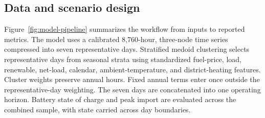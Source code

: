 \documentclass[preprint,12pt]{elsarticle}
\begin{document}
\subsection{Data and scenario design}

Figure~\ref{fig:model-pipeline} summarizes the workflow from inputs to reported metrics. The model uses a calibrated 8,760-hour, three-node time series compressed into seven representative days. Stratified medoid clustering selects representative days from seasonal strata using standardized fuel-price, load, renewable, net-load, calendar, ambient-temperature, and district-heating features. Cluster weights preserve annual hours. Fixed annual terms enter once outside the representative-day weighting. The seven days are concatenated into one operating horizon. Battery state of charge and peak import are evaluated across the combined sample, with state carried across day boundaries.
\end{document}
